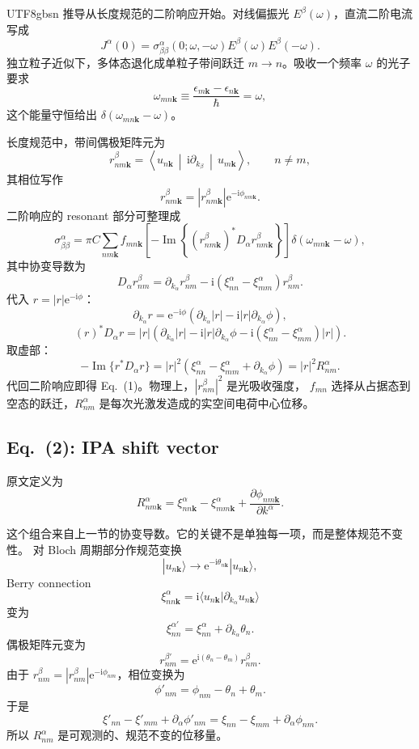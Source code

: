 \documentclass[11pt,a4paper]{article}
\newcommand{\ii}{\mathrm{i}}
\newcommand{\ee}{\mathrm{e}}
\newcommand{\mel}[3]{\left\langle #1\,\middle|\,#2\,\middle|\,#3\right\rangle}
\newcommand{\Impart}{\operatorname{Im}}
\begin{document}
\begin{CJK}{UTF8}{gbsn}
推导从长度规范的二阶响应开始。对线偏振光 $E^\beta(\omega)$，直流二阶电流写成
\[
J^\alpha(0)=\sigma^\alpha_{\beta\beta}(0;\omega,-\omega)
E^\beta(\omega)E^\beta(-\omega).
\]
独立粒子近似下，多体态退化成单粒子带间跃迁 $m\to n$。吸收一个频率 $\omega$ 的光子要求
\[
\omega_{mn\bm k}\equiv \frac{\epsilon_{m\bm k}-\epsilon_{n\bm k}}{\hbar}
=\omega,
\]
这个能量守恒给出 $\delta(\omega_{mn\bm k}-\omega)$。

长度规范中，带间偶极矩阵元为
\[
r^\beta_{nm\bm k}
=\mel{u_{n\bm k}}{\ii\partial_{k_\beta}}{u_{m\bm k}},
\qquad n\ne m,
\]
其相位写作
\[
r^\beta_{nm\bm k}
=\left|r^\beta_{nm\bm k}\right|
\ee^{-\ii\phi_{nm\bm k}}.
\]
二阶响应的 resonant 部分可整理成
\[
\sigma^\alpha_{\beta\beta}
=\pi C
\sum_{nm\bm k}
f_{mn\bm k}
\left[-\Impart\left\{(r^\beta_{nm\bm k})^*
D_\alpha r^\beta_{nm\bm k}\right\}\right]
\delta(\omega_{mn\bm k}-\omega),
\]
其中协变导数为
\[
D_\alpha r^\beta_{nm}
=\partial_{k_\alpha}r^\beta_{nm}
-\ii(\xi^\alpha_{nn}-\xi^\alpha_{mm})r^\beta_{nm}.
\]
代入 $r=|r|\ee^{-\ii\phi}$：
\[
\partial_{k_\alpha}r
=\ee^{-\ii\phi}\left(\partial_{k_\alpha}|r|
-\ii |r|\partial_{k_\alpha}\phi\right),
\]
\[
(r)^*D_\alpha r
=|r|\left(\partial_{k_\alpha}|r|
-\ii |r|\partial_{k_\alpha}\phi
-\ii(\xi^\alpha_{nn}-\xi^\alpha_{mm})|r|\right).
\]
取虚部：
\[
-\Impart\{r^*D_\alpha r\}
=|r|^2
\left(\xi^\alpha_{nn}-\xi^\alpha_{mm}
+\partial_{k_\alpha}\phi\right)
=|r|^2R^\alpha_{nm}.
\]
代回二阶响应即得 Eq.~(1)。物理上，$\left|r^\beta_{nm}\right|^2$ 是光吸收强度，
$f_{mn}$ 选择从占据态到空态的跃迁，$R^\alpha_{nm}$ 是每次光激发造成的实空间电荷中心位移。

\subsection*{Eq.~(2): IPA shift vector}

原文定义为
\begin{equation}
R^\alpha_{nm\bm k}
=\xi^\alpha_{nn\bm k}-\xi^\alpha_{mm\bm k}
+\frac{\partial\phi_{nm\bm k}}{\partial k^\alpha}.
\tag{2}
\end{equation}

这个组合来自上一节的协变导数。它的关键不是单独每一项，而是整体规范不变性。
对 Bloch 周期部分作规范变换
\[
|u_{n\bm k}\rangle\rightarrow
\ee^{-\ii\theta_{n\bm k}}|u_{n\bm k}\rangle,
\]
Berry connection
\[
\xi^\alpha_{nn\bm k}
=\ii\langle u_{n\bm k}|\partial_{k_\alpha}u_{n\bm k}\rangle
\]
变为
\[
\xi^{\alpha\prime}_{nn}
=\xi^\alpha_{nn}+\partial_{k_\alpha}\theta_n.
\]
偶极矩阵元变为
\[
r^{\beta\prime}_{nm}
=\ee^{\ii(\theta_n-\theta_m)}r^\beta_{nm}.
\]
由于 $r^\beta_{nm}=|r^\beta_{nm}|\ee^{-\ii\phi_{nm}}$，相位变换为
\[
\phi'_{nm}
=\phi_{nm}-\theta_n+\theta_m.
\]
于是
\[
\xi'_{nn}-\xi'_{mm}+\partial_\alpha\phi'_{nm}
=\xi_{nn}-\xi_{mm}+\partial_\alpha\phi_{nm}.
\]
所以 $R^\alpha_{nm}$ 是可观测的、规范不变的位移量。


\end{CJK}
\end{document}
